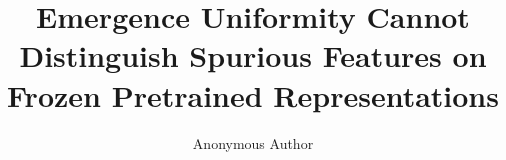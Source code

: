 \documentclass[10pt,twocolumn]{article}
\title{Emergence Uniformity Cannot Distinguish Spurious Features on Frozen Pretrained Representations}
\author{Anonymous Author}
\date{}
\begin{document}
\maketitle


\begin{abstract}

\end{abstract}















\newpage
\appendix

\end{document}
